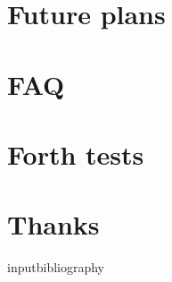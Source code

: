 \documentclass[a4paper,notitlepage]{report}
\begin{document}
\chapter{Future plans}


\appendix

\chapter{FAQ}
        

\chapter{Forth tests}
        

\chapter{Thanks}
        

input{bibliography}

\begin{theindex}
\end{theindex}
\end{document}

